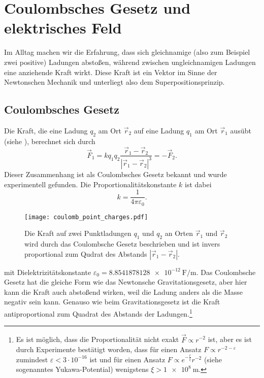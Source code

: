 \section{Coulombsches Gesetz und elektrisches Feld}

Im Alltag machen wir die Erfahrung, dass sich gleichnamige (also zum Beispiel zwei positive) Ladungen abstoßen, während zwischen ungleichnamigen Ladungen eine anziehende Kraft wirkt. Diese Kraft ist ein Vektor im Sinne der Newtonschen Mechanik und unterliegt also dem Superpositionsprinzip.


\subsection{Coulombsches Gesetz}

Die Kraft, die eine Ladung $q_{2}$ am Ort $\vec {r}_{2}$ auf eine Ladung $q_{1}$ am Ort $\vec {r}_{1}$ ausübt (siehe ), berechnet sich durch
\begin{equation}
	\label{3.1}
	\boxed{\vec {F}_{1}=kq_{1}q_{2}\frac{\vec {r}_{1}-\vec {r}_{2}}{\left| \vec {r}_{1}-\vec {r}_{2}\right| ^{3}}=-\vec {F}_{2}.}
\end{equation}
Dieser Zusammenhang ist als Coulombsches Gesetz bekannt und wurde experimentell gefunden. Die Proportionalitätskonstante $k$ ist dabei
\begin{equation*}
	k=\frac{1}{4\pi \varepsilon _{0}}. 
\end{equation*}

\begin{figure}[htb]
	\centering
	\texttt{[image: coulomb\_point\_charges.pdf]}
	\caption{Die Kraft auf zwei Punktladungen $q_1$ und $q_2$ an Orten $\vec r_1$ und $\vec r_2$ wird durch das Coulombsche Gesetz beschrieben und ist invers proportional zum Qudrat des Abstands $\left|\vec r_1-\vec r_2\right|$. }
	\label{fig:coulomb_point_charges}
\end{figure}

mit Dielektrizitätskonstante $\varepsilon _{0}=\SI{8,8541878128e-12}{\farad\per\m}$. Das Coulombsche Gesetz hat die gleiche Form wie das Newtonsche Gravitationsgesetz, aber hier kann die Kraft auch abstoßend wirken, weil die Ladung anders als die Masse negativ sein kann. Genauso wie beim Gravitationsgesetz ist die Kraft antiproportional zum Quadrat des Abstands der Ladungen.\footnote{Es ist möglich, dass die Proportionalität nicht exakt $\vec {F}\propto r^{-2}$ ist, aber es ist durch Experimente bestätigt worden, dass für einen Ansatz $F\propto r^{-2-\varepsilon }$ zumindest $\varepsilon <3\cdot 10^{-16}$ ist und für einen Ansatz $F\propto e^{-\frac{r}{\xi }}r^{-2}$ (siehe sogenanntes Yukawa-Potential) wenigstens $\xi >\SI{1e8}{\m}$. }

